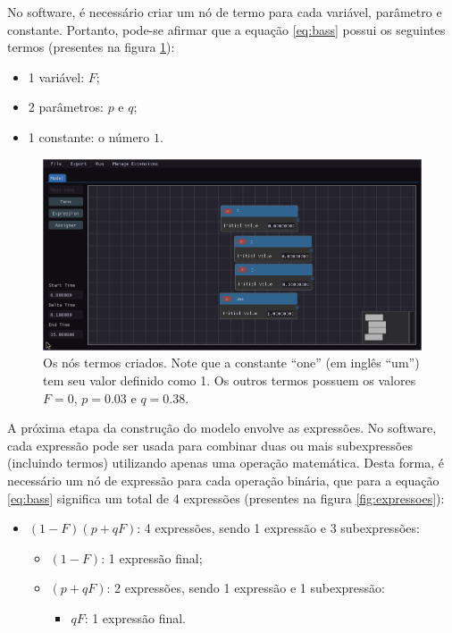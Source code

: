 \documentclass[
	12pt,				%
	openright,			%
	oneside,			%
	a4paper,			%
	main=brazil,
	english,			%
	]{ufsj-abntex2}
\begin{document}
No software, é necessário criar um nó de termo para cada variável, parâmetro e constante. Portanto, pode-se afirmar que a equação \ref{eq:bass} possui os seguintes termos (presentes na figura \ref{fig:termos}):

\begin{itemize}
    \item 1 variável: $F$;
    \item 2 parâmetros: $p$ e $q$;
    \item 1 constante: o número $1$.
\end{itemize}

\begin{figure}[h]
    \centering
    \includegraphics[width=\textwidth]{imgs/ode-designer/passo-a-passo/termos.png} 
    \caption{Os nós termos criados. Note que a constante ``one'' (em inglês ``um'') tem seu valor definido como 1. Os outros termos possuem os valores $F = 0$, $p = 0.03$ e $q = 0.38$.}
    \label{fig:termos}
\end{figure}

A próxima etapa da construção do modelo envolve as expressões. No software, cada expressão pode ser usada para combinar duas ou mais subexpressões (incluindo termos) utilizando apenas uma operação matemática. Desta forma, é necessário um nó de expressão para cada operação binária, que para a equação \ref{eq:bass} significa um total de 4 expressões (presentes na figura \ref{fig:expressoes}):

\begin{itemize}
    \item $(1 - F)(p + qF)$: 4 expressões, sendo 1 expressão e 3 subexpressões:
    \begin{itemize}
        \item $(1 - F)$: 1 expressão final;
        \item $(p + qF)$: 2 expressões, sendo 1 expressão e 1 subexpressão:
        \begin{itemize}
            \item $qF$: 1 expressão final.
        \end{itemize}
    \end{itemize}
\end{itemize}
\end{document}
